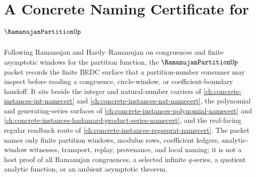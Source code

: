\chapter{A Concrete Naming Certificate for $\RamanujanPartitionUp$}
\label{ch:concrete-instances-ramanujan-partition-namecert}

Following Ramanujan and Hardy--Ramanujan on congruences and finite asymptotic windows for the partition function, the $\RamanujanPartitionUp$ packet records the finite BEDC surface that a partition-number consumer may inspect before reading a congruence, circle-window, or coefficient-boundary handoff. It sits beside the integer and natural-number carriers of \autoref{ch:concrete-instances-int-namecert} and \autoref{ch:concrete-instances-nat-namecert}, the polynomial and generating-series surfaces of \autoref{ch:concrete-instances-polynomial-namecert} and \autoref{ch:concrete-instances-hadamard-product-series-namecert}, and the real-facing regular readback route of \autoref{ch:concrete-instances-regseqrat-namecert}. The packet names only finite partition windows, modulus rows, coefficient ledgers, analytic-window witnesses, transport, replay, provenance, and local naming; it is not a host proof of all Ramanujan congruences, a selected infinite $q$-series, a quotient analytic function, or an ambient asymptotic theorem.

